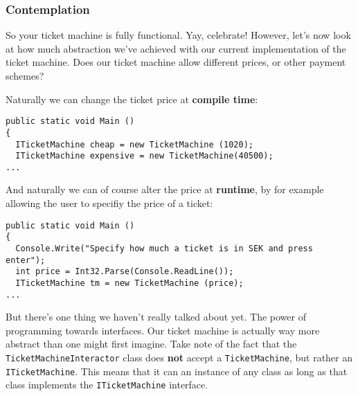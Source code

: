 \documentclass{article}
\newcounter{stepcounter}
\begin{document}
\subsubsection{Contemplation}
So your ticket machine is fully functional. Yay, celebrate! However, let’s now look at how much abstraction we've achieved with our current implementation of the ticket machine. Does our ticket machine allow different prices, or other payment schemes?

Naturally we can change the ticket price at \textbf{compile time}:
\begin{lstlisting}
public static void Main ()
{ 
  ITicketMachine cheap = new TicketMachine (1020);
  ITicketMachine expensive = new TicketMachine(40500);
...
\end{lstlisting}
And naturally we can of course alter the price at \textbf{runtime}, by for example allowing the user to specifiy the price of a ticket:
\begin{lstlisting}
public static void Main ()
{ 
  Console.Write("Specify how much a ticket is in SEK and press enter");
  int price = Int32.Parse(Console.ReadLine());
  ITicketMachine tm = new TicketMachine (price);
...
\end{lstlisting}
But there's one thing we haven't really talked about yet. The power of programming towards interfaces. Our ticket machine is actually way more abstract than one might first imagine. Take note of the fact that the \texttt{TicketMachineInteractor} class does \textbf{not} accept a \texttt{TicketMachine}, but rather an \texttt{ITicketMachine}. This means that it can an instance of any class as long as that class implements the \texttt{ITicketMachine} interface.






\setcounter{stepcounter}{0}
\pagebreak
\end{document}
